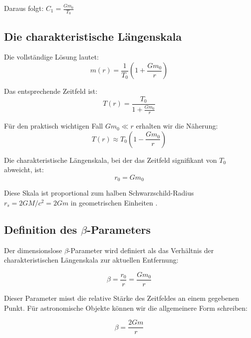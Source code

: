 \documentclass[12pt,a4paper]{article}
\begin{document}
	Daraus folgt: $C_1 = \frac{G m_0}{T_0}$
	
	\subsection{Die charakteristische Längenskala}
	\label{subsec:characteristic_length}
	
	Die vollständige Lösung lautet:
	\begin{equation}
		m(r) = \frac{1}{T_0}\left(1 + \frac{G m_0}{r}\right)
	\end{equation}
	
	Das entsprechende Zeitfeld ist:
	\begin{equation}
		T(r) = \frac{T_0}{1 + \frac{G m_0}{r}}
	\end{equation}
	
	Für den praktisch wichtigen Fall $G m_0 \ll r$ erhalten wir die Näherung:
	\begin{equation}
		T(r) \approx T_0\left(1 - \frac{G m_0}{r}\right)
	\end{equation}
	
	Die charakteristische Längenskala, bei der das Zeitfeld signifikant von $T_0$ abweicht, ist:
	\begin{equation}
		\boxed{r_0 = G m_0}
	\end{equation}
	
	Diese Skala ist proportional zum halben Schwarzschild-Radius $r_s = 2GM/c^2 = 2Gm$ in geometrischen Einheiten \citep{misner1973,carroll2004}.
	
	\subsection{Definition des $\beta$-Parameters}
	\label{subsec:beta_definition}
	
	Der dimensionslose $\beta$-Parameter wird definiert als das Verhältnis der charakteristischen Längenskala zur aktuellen Entfernung:
	
	\begin{equation}
		\boxed{\beta = \frac{r_0}{r} = \frac{G m_0}{r}}
	\end{equation}
	
	Dieser Parameter misst die relative Stärke des Zeitfeldes an einem gegebenen Punkt. Für astronomische Objekte können wir die allgemeinere Form schreiben:
	
	\begin{equation}
		\boxed{\beta = \frac{2Gm}{r}}
	\end{equation}
	
\end{document}
